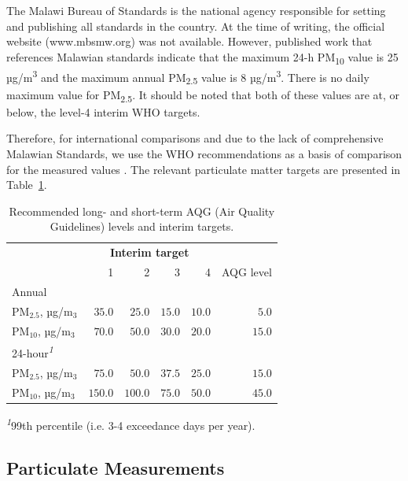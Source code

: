 \documentclass[
  authoryear,
  review,
  3p]{elsarticle}
\begin{document}
The Malawi Bureau of Standards is the national agency responsible for
setting and publishing all standards in the country. At the time of
writing, the official website (www.mbsmw.org) was not available.
However, published work that references Malawian standards
\citep{kutlarjoss2017time, mapoma2014air} indicate that the maximum 24-h
PM\textsubscript{10} value is 25 µg/m\textsuperscript{3} and the maximum
annual PM\textsubscript{2.5} value is 8 µg/m\textsuperscript{3}. There
is no daily maximum value for PM\textsubscript{2.5}. It should be noted
that both of these values are at, or below, the level-4 interim WHO
targets.

Therefore, for international comparisons and due to the lack of
comprehensive Malawian Standards, we use the WHO recommendations as a
basis of comparison for the measured values
\citep{worldhealthorganization2021who}. The relevant particulate matter
targets are presented in Table~\ref{tbl-who-targets}.

\hypertarget{tbl-who-targets}{}
\setlength{\LTpost}{0mm}
\begin{longtable}{l|rrrrr}
\caption{\label{tbl-who-targets}Recommended long- and short-term AQG (Air Quality Guidelines) levels and
interim targets. }\tabularnewline

\toprule
\multicolumn{1}{l}{} & \multicolumn{4}{c}{\textbf{Interim target}} &  \\ 
\cmidrule(lr){2-5}
\multicolumn{1}{l}{} & 1 & 2 & 3 & 4 & AQG level \\ 
\midrule
\multicolumn{6}{l}{Annual} \\ 
\midrule
PM$_{2.5}$, µg/m$_{3}$ & $35.0$ & $25.0$ & $15.0$ & $10.0$ & $5.0$ \\ 
PM$_{10}$, µg/m$_{3}$ & $70.0$ & $50.0$ & $30.0$ & $20.0$ & $15.0$ \\ 
\midrule
\multicolumn{6}{l}{24-hour\textsuperscript{\textit{1}}} \\ 
\midrule
PM$_{2.5}$, µg/m$_{3}$ & $75.0$ & $50.0$ & $37.5$ & $25.0$ & $15.0$ \\ 
PM$_{10}$, µg/m$_{3}$ & $150.0$ & $100.0$ & $75.0$ & $50.0$ & $45.0$ \\ 
\bottomrule
\end{longtable}
\begin{minipage}{\linewidth}
\textsuperscript{\textit{1}}99th percentile (i.e. 3-4 exceedance days per year).\\
\end{minipage}

\hypertarget{particulate-measurements}{%
\subsection{Particulate Measurements}\label{particulate-measurements}}
\end{document}
